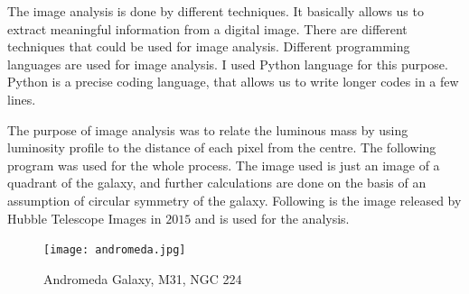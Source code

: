 The image analysis is done by different techniques. It basically allows us to extract meaningful information from a digital image. There are different techniques that could be used for image analysis. Different programming languages are used for image analysis. I used Python language for this purpose. Python is a precise coding language, that allows us to write longer codes in a few lines.

The purpose of image analysis was to relate the luminous mass by using luminosity profile to the distance of each pixel from the centre. The following program was used for the whole process. The image used is just an image of a quadrant of the galaxy, and further calculations are done on the basis of an assumption of circular symmetry of the galaxy. Following is the image released by Hubble Telescope Images in $2015$ and is used for the analysis.
\begin{figure}[h!]
\centering
\texttt{[image: andromeda.jpg]}
\caption{Andromeda Galaxy, M31, NGC 224}
\end{figure}

